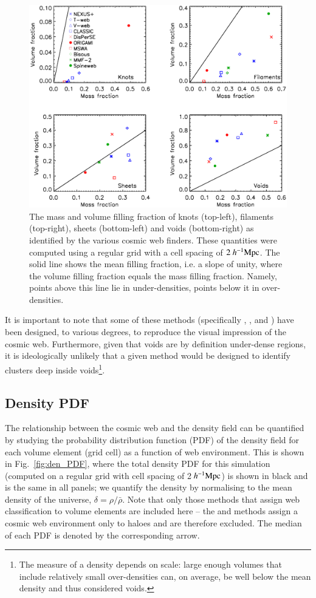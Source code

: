 \begin{figure}
 \includegraphics[width=\textwidth]{Chapter3b/FIGS/vff-mff}
 \vspace{-.7cm}
 \caption{ The mass and volume filling fraction of knots (top-left), filaments (top-right), sheets (bottom-left) and voids (bottom-right) as identified by the various cosmic web finders. These quantities were computed using a regular grid with a cell spacing of $2~h^{-1}\rm Mpc$. The solid line shows the mean filling fraction, i.e. a slope of unity, where the volume filling fraction equals the mass filling fraction. Namely, points above this line lie in under-densities, points below it in over-densities. }
 \label{fig:vff_mff}
\end{figure}

It is important to note that some of these methods (specifically \nexus{}, \mmft{}, \tweb{} and \vweb{}) have been designed, to various degrees, to reproduce the visual impression of the cosmic web. Furthermore, given that voids are by definition under-dense regions, it is ideologically unlikely that a given method would be designed to identify clusters deep inside voids\footnote{The measure of a density depends on scale: large enough volumes that include relatively small over-densities can, on average, be well below the mean density and thus considered voids.}.

\subsection{Density PDF}
The relationship between the cosmic web and the density field can be quantified by studying the probability distribution function (PDF) of the density field for each volume element (grid cell) as a function of web environment. This is shown in Fig.~\ref{fig:den_PDF}, where the total density PDF for this simulation (computed on a regular grid with cell spacing of 2$~h^{-1}\rm Mpc$) is shown in black and is the same in all panels; we quantify the density by normalising to the mean density of the universe, $\delta=\rho/\bar{\rho}$. Note that only those methods that assign web classification to volume elements are included here -- the \fine{} and \mst{} methods assign a cosmic web environment only to haloes and are therefore excluded. The median of each PDF is denoted by the corresponding arrow.

